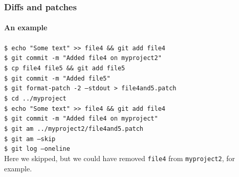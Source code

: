 \begin{frame}
\frametitle{Diffs and patches}
\framesubtitle{An example}

\texttt{\$ echo "Some text"  >\;\!\!> file4 \&\& git add file4} \\
\texttt{\$ git commit -m "Added file4 on myproject2"} \\
\texttt{\$ cp file4 file5 \&\& git add file5} \\
\texttt{\$ git commit -m "Added file5"} \\
\texttt{\$ git format-patch -2 ---stdout > file4and5.patch} \\
\texttt{\$ cd ../myproject} \\
\texttt{\$ echo "Some text"  >\;\!\!> file4 \&\& git add file4} \\
\texttt{\$ git commit -m "Added file4 on myproject"} \\
\texttt{\$ git am ../myproject2/file4and5.patch} \\
\texttt{\$ git am ---skip} \\
\texttt{\$ git log --oneline} \\

\medskip
\pause
Here we skipped, but we could have removed \texttt{file4} from \texttt{myproject2}, for example.
\end{frame}
